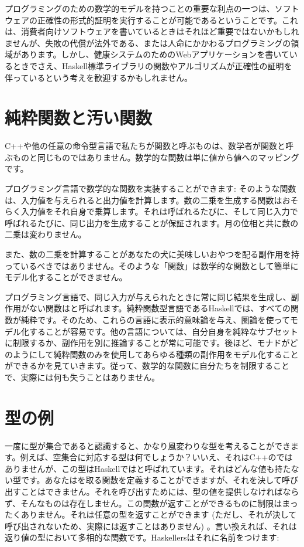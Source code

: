 プログラミングのための数学的モデルを持つことの重要な利点の一つは、ソフトウェアの正確性の形式的証明を実行することが可能であるということです。これは、消費者向けソフトウェアを書いているときはそれほど重要ではないかもしれませんが、失敗の代償が法外である、または人命にかかわるプログラミングの領域があります。しかし、健康システムのためのWebアプリケーションを書いているときでさえ、Haskell標準ライブラリの関数やアルゴリズムが正確性の証明を伴っているという考えを歓迎するかもしれません。

\section{純粋関数と汚い関数}

C++や他の任意の命令型言語で私たちが関数と呼ぶものは、数学者が関数と呼ぶものと同じものではありません。数学的な関数は単に値から値へのマッピングです。

プログラミング言語で数学的な関数を実装することができます: そのような関数は、入力値を与えられると出力値を計算します。数の二乗を生成する関数はおそらく入力値をそれ自身で乗算します。それは呼ばれるたびに、そして同じ入力で呼ばれるたびに、同じ出力を生成することが保証されます。月の位相と共に数の二乗は変わりません。

また、数の二乗を計算することがあなたの犬に美味しいおやつを配る副作用を持っているべきではありません。そのような「関数」は数学的な関数として簡単にモデル化することができません。

プログラミング言語で、同じ入力が与えられたときに常に同じ結果を生成し、副作用がない関数はと呼ばれます。純粋関数型言語であるHaskellでは、すべての関数が純粋です。そのため、これらの言語に表示的意味論を与え、圏論を使ってモデル化することが容易です。他の言語については、自分自身を純粋なサブセットに制限するか、副作用を別に推論することが常に可能です。後ほど、モナドがどのようにして純粋関数のみを使用してあらゆる種類の副作用をモデル化することができるかを見ていきます。従って、数学的な関数に自分たちを制限することで、実際には何も失うことはありません。

\section{型の例}

一度に型が集合であると認識すると、かなり風変わりな型を考えることができます。例えば、空集合に対応する型は何でしょうか？いいえ、それはC++のではありませんが、この型はHaskellではと呼ばれています。それはどんな値も持たない型です。あなたはを取る関数を定義することができますが、それを決して呼び出すことはできません。それを呼び出すためには、型の値を提供しなければならず、そんなものは存在しません。この関数が返すことができるものに制限はまったくありません。それは任意の型を返すことができます (ただし、それが決して呼び出されないため、実際には返すことはありません) 。言い換えれば、それは返り値の型において多相的な関数です。Haskellersはそれに名前をつけます: 

